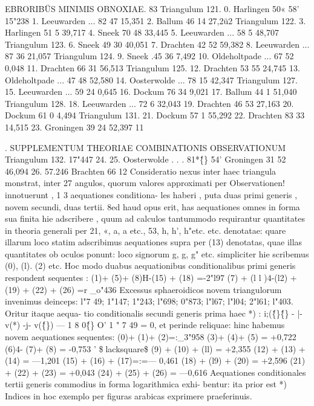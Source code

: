 \documentclass[12pt,a4paper]{article}
\begin{document}
\newpage
EBRORIBÜS MINIMIS OBNOXIAE. 83
Triangulum 121.
0. Harlingen 50« 58' 15"238
1. Leeuwarden ... 82 47 15,351
2. Ballum 46 14 27,2ü2
Triangulum 122.
3. Harlingen 51 5 39,717
4. Sneek 70 48 33,445
5. Leeuwarden ... 58 5 48,707
Triangulum 123.
6. Sneek 49 30 40,051
7. Drachten 42 52 59,382
8. Leeuwarden ... 87 36 21,057
Triangulum 124.
9. Sneek .45 36 7,492
10. Oldeholtpade ... 67 52 0,048
11. Drachten 66 31 56,513
Triangulum 125.
12. Drachten 53 55 24,745
13. Oldeholtpade ... 47 48 52,580
14. Oosterwolde ... 78 15 42,347
Triangulum 127.
15. Leeuwarden ... 59 24 0,645
16. Dockum 76 34 9,021
17. Ballum 44 1 51,040
Triangulum 128.
18. Leeuwarden ... 72 6 32,043
19. Drachten 46 53 27,163
20. Dockum 61 0 4,494
Triangulum 131.
21. Dockum 57 1 55,292
22. Drachten 83 33 14,515
23. Groningen 39 24 52,397
11

 . SUPPLEMENTUM THEORIAE COMBINATIONIS OBSERVATIONUM
Triangulum 132.
17"447
24.
25. Oosterwolde . . . 81*\^\{\} 54'
Groningen 31 52 46,094
26. 57.246
Brachten 66 12
Consideratio nexus inter haec triangula monstrat, inter 27 angulos, quorum
valores approximati per Observationen! innotuerunt , 1 3 aequationes conditiona-
les haberi , puta duas primi generis , novem secundi, duas tertii. 8ed haud opus
erit, has aequationes omnes in forma sua finita hie adscribere , quum ad calculos
tantummodo requirantur quantitates in theoria generali per 21, «, a, a etc.,
53, h, h', h"etc. etc. denotatae: quare illarum loco statim adscribimus aequationes
supra per (13) denotatas, quae illas quantitates ob oculos ponunt: loco signorum
g, g, g" etc. simpliciter hie scribemus (0), (l). (2) etc.
Hoc modo duabus aequationibus conditionalibus primi generis respondent
sequentes :
(1)+ (5)+ (8)H-(15) + (18) =-2"l97
(7) + (l l )4-(l2) + (19) + (22) + (26) =r \_o"436
Excessus sphaeroidicos novem triangulorum invenimus deinceps: l"7 49;
1"147; 1"243; l"698; 0"873; l"l67; l"l04; 2"l61; l"403. Oritur itaque aequa-
tio conditionalis secundi generis prima haec *) : i;(\^\{\}\^\{\} - |- v(*) -j- v(\^\{\}) --- 1 8 0\^\{\} O' 1 " 7 49 = 0,
et perinde reliquae: hinc habemus novem aequationes sequentes:
(0)+ (1)+ (2)=:\_3"958
(3)+ (4)+ (5) = +0,722
(6)4- (7)+ (8) = -0,753 ' \$lacksquare\$
(9) + (10) + (ll) = +2,355
(12) + (13) + (14) = ---1,201
(15) + (16) + (17)=:=--- 0,461
(18) + (l9) + (20) = +2,596
(21) + (22) + (23) = +0,043
(24) + (25) + (26) = ---0,616
Aequationes conditionales tertii generis commodius in forma logarithmica exhi-
bentur: ita prior est
*) Indices in hoc exemplo per figuras arabicas exprimere praeferinuis.
\end{document}
